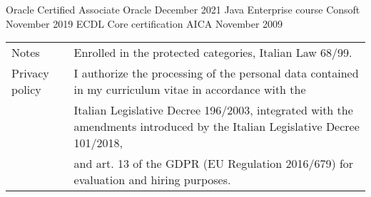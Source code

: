\documentclass[]{style}
\begin{document}
\begin{cvhonors}
	\cvhonor
	{Oracle Certified Associate}
	{}
	{Oracle}
	{December 2021}
	\cvhonor
	{Java Enterprise course}
	{}
	{Consoft}
	{November 2019}
	\cvhonor
	{ECDL Core certification}
	{}
	{AICA}
	{November 2009}
\end{cvhonors}

\makecvfooter
{{\def\arraystretch{1.15}{\begin{tabular}{ l l }
		Notes  & { Enrolled in the protected categories, Italian Law 68/99. } \\
		Privacy policy  & { I authorize the processing of the personal data contained in my curriculum vitae in accordance with the } \\
		& { Italian Legislative Decree 196/2003, integrated with the amendments introduced by the Italian Legislative Decree 101/2018, } \\
		& { and art. 13 of the GDPR (EU Regulation 2016/679) for evaluation and hiring purposes. } \\
		\end{tabular}}}}
{}
{}

\
\end{document}
